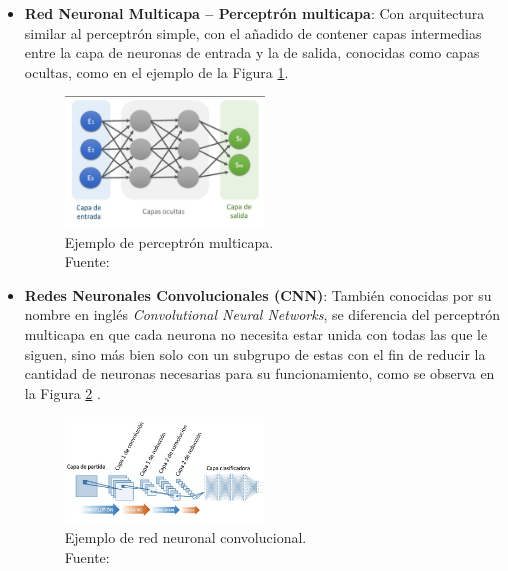 \begin{itemize}
\begin{itemize}
		\item \textbf{Red Neuronal Multicapa – Perceptrón multicapa}: Con arquitectura similar al perceptrón simple, con el añadido de contener capas intermedias entre la capa de neuronas de entrada y la de salida, conocidas como capas ocultas, como en el ejemplo de la Figura \ref{2:fig21}.
		\begin{figure}[h]
			\begin{center}
				\includegraphics[width=0.50\textwidth]{2/figures/perceptron_multicapa.jpg}
				\caption[Ejemplo de perceptrón multicapa]{Ejemplo de perceptrón multicapa.\\
				Fuente: \cite{gl_calvo2017clasifrna}}
				\label{2:fig21}
			\end{center}
		\end{figure}
		
		\item \textbf{Redes Neuronales Convolucionales (CNN)}: También conocidas por su nombre en inglés \textit{Convolutional Neural Networks}, se diferencia del perceptrón multicapa en que cada neurona no necesita estar unida con todas las que le siguen, sino más bien solo con un subgrupo de estas con el fin de reducir la cantidad de neuronas necesarias para su funcionamiento, como se observa en la Figura \ref{2:fig22} \parencite{gl_calvo2017clasifrna}.
		\begin{figure}[h]
			\begin{center}
				\includegraphics[width=0.50\textwidth]{2/figures/cnn.jpg}
				\caption[Ejemplo de red neuronal convolucional]{Ejemplo de red neuronal convolucional.\\
				Fuente: \cite{gl_calvo2017clasifrna}}
				\label{2:fig22}
			\end{center}
		\end{figure}
		

\end{itemize}
\end{itemize}
